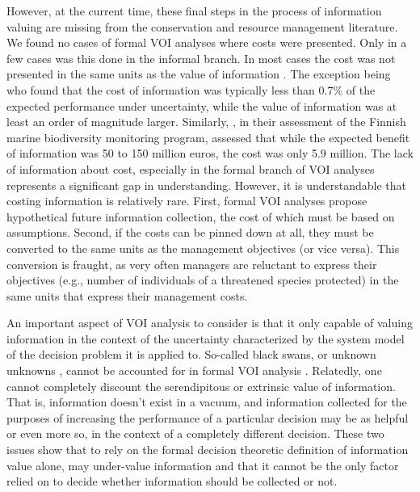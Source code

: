 \documentclass[]{article}
\theoremstyle{definition}
\theoremstyle{definition}
\theoremstyle{definition}
\theoremstyle{remark}
\begin{document}
However, at the current time, these final steps in the process of
information valuing are missing from the conservation and resource
management literature. We found no cases of formal VOI analyses where
costs were presented. Only in a few cases was this done in the informal
branch. In most cases the cost was not presented in the same units as
the value of information \citep{Grantham2008, Grantham2009, Moore2010}.
The exception being \citet{Balmford1999} who found that the cost of
information was typically less than 0.7\% of the expected performance
under uncertainty, while the value of information was at least an order
of magnitude larger. Similarly, \citet{Nygard2016}, in their assessment
of the Finnish marine biodiversity monitoring program, assessed that
while the expected benefit of information was 50 to 150 million euros,
the cost was only 5.9 million. The lack of information about cost,
especially in the formal branch of VOI analyses represents a significant
gap in understanding. However, it is understandable that costing
information is relatively rare. First, formal VOI analyses propose
hypothetical future information collection, the cost of which must be
based on assumptions. Second, if the costs can be pinned down at all,
they must be converted to the same units as the management objectives
(or vice versa). This conversion is fraught, as very often managers are
reluctant to express their objectives (e.g., number of individuals of a
threatened species protected) in the same units that express their
management costs.

An important aspect of VOI analysis to consider is that it only capable
of valuing information in the context of the uncertainty characterized
by the system model of the decision problem it is applied to. So-called
black swans, or unknown unknowns \citep{Wintle2010}, cannot be accounted
for in formal VOI analysis \citep{Runge2011a}. Relatedly, one cannot
completely discount the serendipitous or extrinsic value of information.
That is, information doesn't exist in a vacuum, and information
collected for the purposes of increasing the performance of a particular
decision may be as helpful or even more so, in the context of a
completely different decision. These two issues show that to rely on the
formal decision theoretic definition of information value alone, may
under-value information and that it cannot be the only factor relied on
to decide whether information should be collected or not.


\end{document}
